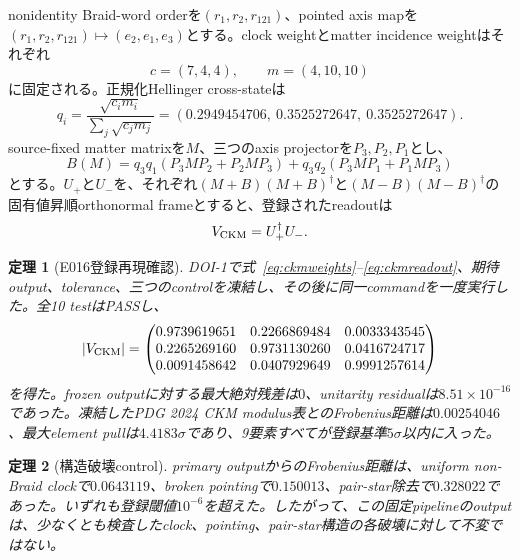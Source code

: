 \documentclass[11pt]{article}
\newtheorem{theorem}{定理}[section]
\theoremstyle{definition}
\theoremstyle{remark}
\begin{document}
nonidentity Braid-word orderを$(r_1,r_2,r_{121})$、pointed axis mapを
$(r_1,r_2,r_{121})\mapsto(e_2,e_1,e_3)$とする。clock weightとmatter incidence weightはそれぞれ
\begin{equation}
c=(7,4,4),
\qquad m=(4,10,10)
\label{eq:ckmweights}
\end{equation}
に固定される。正規化Hellinger cross-stateは
\begin{equation}
q_i=\frac{\sqrt{c_i m_i}}{\sum_j\sqrt{c_jm_j}}
=(0.2949454706,\ 0.3525272647,\ 0.3525272647).
\label{eq:ckmq}
\end{equation}
source-fixed matter matrixを$M$、三つのaxis projectorを$P_3,P_2,P_1$とし、
\begin{equation}
B(M)=q_3q_1(P_3MP_2+P_2MP_3)
      +q_3q_2(P_3MP_1+P_1MP_3)
\label{eq:pairstar}
\end{equation}
とする。$U_+$と$U_-$を、それぞれ$(M+B)(M+B)^\dagger$と$(M-B)(M-B)^\dagger$の固有値昇順orthonormal frameとすると、登録されたreadoutは
\begin{equation}
V_{\rm CKM}=U_+^\dagger U_-.
\label{eq:ckmreadout}
\end{equation}

\begin{theorem}[E016登録再現確認]
DOI-1で式~\eqref{eq:ckmweights}--\eqref{eq:ckmreadout}、期待output、tolerance、三つのcontrolを凍結し、その後に同一commandを一度実行した。全10 testはPASSし、
\begin{equation}
|V_{\rm CKM}|=
\begin{pmatrix}
0.9739619651&0.2266869484&0.0033343545\\
0.2265269160&0.9731130260&0.0416724717\\
0.0091458642&0.0407929649&0.9991257614
\end{pmatrix}
\label{eq:ckmconfirmed}
\end{equation}
を得た。frozen outputに対する最大絶対残差は$0$、unitarity residualは$8.51\times10^{-16}$であった。凍結したPDG 2024 CKM modulus表とのFrobenius距離は$0.00254046$、最大element pullは$4.4183\sigma$であり、9要素すべてが登録基準$5\sigma$以内に入った\cite{pdg2024ckm}。
\end{theorem}

\begin{theorem}[構造破壊control]
primary outputからのFrobenius距離は、uniform non-Braid clockで$0.0643119$、broken pointingで$0.150013$、pair-star除去で$0.328022$であった。いずれも登録閾値$10^{-6}$を超えた。したがって、この固定pipelineのoutputは、少なくとも検査したclock、pointing、pair-star構造の各破壊に対して不変ではない。
\end{theorem}
\end{document}
